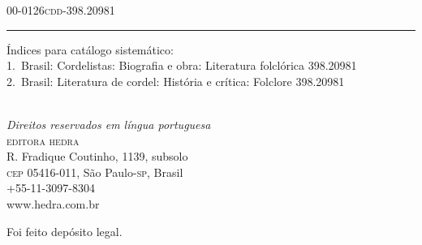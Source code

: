 \begin{center}
\begin{minipage}{.8\textwidth}
00-0126\hfill \textsc{cdd}-398.20981

\vspace{1ex}\hrule\vspace{1ex}
Índices para catálogo sistemático:\\
1.~Brasil: Cordelistas: Biografia e obra: Literatura folclórica 398.20981\\
2.~Brasil: Literatura de cordel: História e crítica: Folclore 398.20981
\end{minipage}
\vfill

\fontsize{9pt}{\baselineskip}\selectfont
[\the\year]\\
\textit{Direitos reservados em língua portuguesa}\\
\textsc{editora hedra}\\
R. Fradique Coutinho, 1139, subsolo\\
\textsc{cep} 05416-011,  São Paulo-\textsc{sp}, Brasil\\
+55-11-3097-8304\\ 
www.hedra.com.br\\\smallskip

Foi feito depósito legal.

\end{center}
\endgroup
